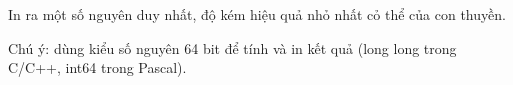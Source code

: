 In ra một số nguyên duy nhất, độ kém hiệu quả nhỏ nhất cỏ thể của con thuyền.  

   Chú ý: dùng kiểu số nguyên 64 bit để tính và in kết quả (long long trong C/C++, int64 trong Pascal).